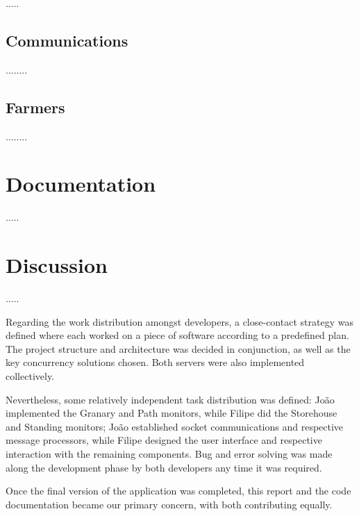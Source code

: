 \documentclass[12pt]{article}
\begin{document}
.....

\subsection{Communications} %

........

\subsection{Farmers} %

........

\newpage
\section{Documentation} %

.....

\newpage
\section{Discussion} %

.....

Regarding the work distribution amongst developers, a close-contact strategy was defined where each worked on a piece of software according to a predefined plan. 
The project structure and architecture was decided in conjunction, as well as the key concurrency solutions chosen.
Both servers were also implemented collectively.

Nevertheless, some relatively independent task distribution was defined: João implemented the Granary and Path monitors, while Filipe did the Storehouse and 
Standing monitors; João established socket communications and respective message processors, while Filipe designed the user interface and respective interaction
with the remaining components.
Bug and error solving was made along the development phase by both developers any time it was required.

Once the final version of the application was completed, this report and the code documentation became our primary concern, with both contributing equally.
\end{document}
